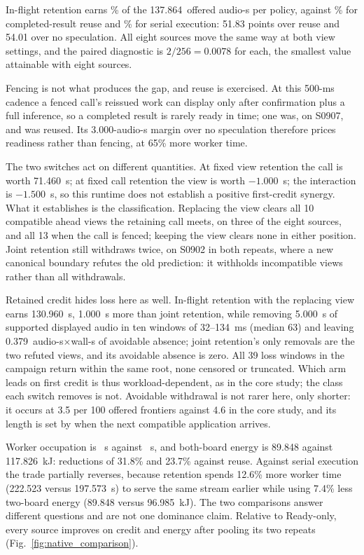 In-flight retention earns \NativeFullCreditPct\% of the 137.864~offered
audio-s per policy, against \NativeReadyCreditPct\% for completed-result
reuse and \NativeConsCreditPct\% for serial execution: 51.83 points over
reuse and 54.01 over no speculation. All eight sources move the same way
at both view settings, and the paired diagnostic is $2/256=0.0078$ for
each, the smallest value attainable with eight sources.

Fencing is not what produces the gap, and reuse is exercised. At this
500-ms cadence a fenced call's reissued work can display only after
confirmation plus a full inference, so a completed result is rarely
ready in time; one was, on S0907, and was reused. Its 3.000-audio-s
margin over no speculation therefore prices readiness rather than
fencing, at 65\% more worker time.

The two switches act on different quantities. At fixed view retention
the call is worth 71.460~s; at fixed call retention the view is worth
$-1.000$~s; the interaction is $-1.500$~s, so this runtime does not
establish a positive first-credit synergy. What it establishes is the
classification. Replacing the view clears all 10 compatible ahead views
the retaining call meets, on three of the eight sources, and all 13 when
the call is fenced; keeping the view clears none in either position.
Joint retention still withdraws twice, on S0902 in both repeats, where a
new canonical boundary refutes the old prediction: it withholds
incompatible views rather than all withdrawals.

Retained credit hides loss here as well. In-flight retention with the
replacing view earns 130.960~s, 1.000~s more than joint retention, while
removing 5.000~s of supported displayed audio in ten windows of
32--134~ms (median 63) and leaving 0.379~audio-s$\times$wall-s of
avoidable absence; joint retention's only removals are the two refuted
views, and its avoidable absence is zero. All 39 loss windows in the
campaign return within the same root, none censored or truncated. Which
arm leads on first credit is thus workload-dependent, as in the core
study; the class each switch removes is not. Avoidable withdrawal is not
rarer here, only shorter: it occurs at 3.5 per 100 offered frontiers
against 4.6 in the core study, and its length is set by when the next
compatible application arrives.

Worker occupation is \NativeFullWorkerSeconds~s against
\NativeReadyWorkerSeconds~s, and both-board energy is 89.848 against
117.826~kJ: reductions of 31.8\% and 23.7\% against reuse. Against
serial execution the trade partially reverses, because retention spends
12.6\% more worker time (222.523 versus 197.573~s) to serve the same
stream earlier while using 7.4\% less two-board energy (89.848 versus
96.985~kJ). The two comparisons answer different questions and are not
one dominance claim. Relative to Ready-only, every source improves on
credit and energy after pooling its two repeats
(Fig.~\ref{fig:native_comparison}).

